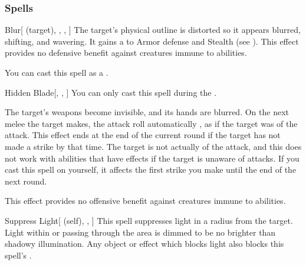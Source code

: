 \subsubsection{Spells}


\lowercase{\hypertarget{spell:Blur}{}}\label{spell:Blur}
\begin{attuneability}[\nth{1}]{\hypertarget{spell:Blur}{Blur}}[ (target), , , ]
The target's physical outline is distorted so it appears blurred, shifting, and wavering.
It gains a   to Armor defense and Stealth (see ).
This effect provides no defensive benefit against creatures immune to  abilities.

You can cast this spell as a .
\end{attuneability}
\vspace{0.25em}



\lowercase{\hypertarget{spell:Hidden Blade}{}}\label{spell:Hidden Blade}
\begin{freeability}[\nth{1}]{\hypertarget{spell:Hidden Blade}{Hidden Blade}}[, , ]
You can only cast this spell during the .

The target's weapons become invisible, and its hands are blurred.
On the next melee  the target makes,
the attack roll automatically ,
as if the target was  of the attack.
This effect ends at the end of the current round if the target has not made a strike by that time.
The target is not actually  of the attack, and this does not work with abilities that have effects if the target is unaware of attacks.
If you cast this spell on yourself, it affects the first strike you make until the end of the next round.

This effect provides no offensive benefit against creatures immune to  abilities.
\end{freeability}
\vspace{0.25em}



\lowercase{\hypertarget{spell:Suppress Light}{}}\label{spell:Suppress Light}
\begin{attuneability}[\nth{1}]{\hypertarget{spell:Suppress Light}{Suppress Light}}[ (self), , ]
This spell suppresses light in a \areamed radius  from the target.
Light within or passing through the area is dimmed to be no brighter than shadowy illumination.
Any object or effect which blocks light also blocks this spell's .
\end{attuneability}
\vspace{0.25em}



